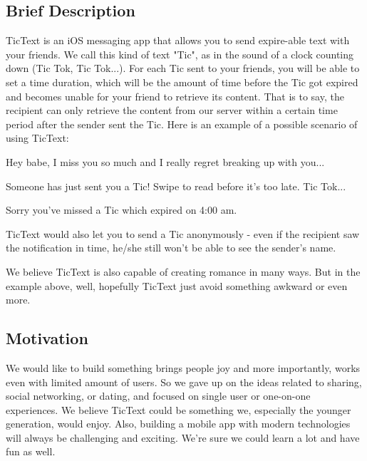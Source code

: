 \subsection{Brief Description}
TicText is an iOS messaging app that allows you to send expire-able text with your friends. We call this kind of text "Tic", as in the sound of a clock counting down (Tic Tok, Tic Tok...). For each Tic sent to your friends, you will be able to set a time duration, which will be the amount of time before the Tic got expired and becomes unable for your friend to retrieve its content. That is to say, the recipient can only retrieve the content from our server within a certain time period after the sender sent the Tic. Here is an example of a possible scenario of using TicText:

\begin{dialogue}
	 
	
		\medskip
		Hey babe, I miss you so much and I really regret breaking up with you...
	
		\medskip
	 Someone has just sent you a Tic! Swipe to read before it's too late. Tic Tok...
	
		\medskip
	 Sorry you've missed a Tic which expired on 4:00 am.
\end{dialogue}

TicText would also let you to send a Tic anonymously - even if the recipient saw the notification in time, he/she still won't be able to see the sender's name.

We believe TicText is also capable of creating romance in many ways. But in the example above, well, hopefully TicText just avoid something awkward or even more. 
\subsection{Motivation}
We would like to build something brings people joy and more importantly, works even with limited amount of users. So we gave up on the ideas related to sharing, social networking, or dating, and focused on single user or one-on-one experiences. We believe TicText could be something we, especially the younger generation, would enjoy. Also, building a mobile app with modern technologies will always be challenging and exciting. We're sure we could learn a lot and have fun as well. 

